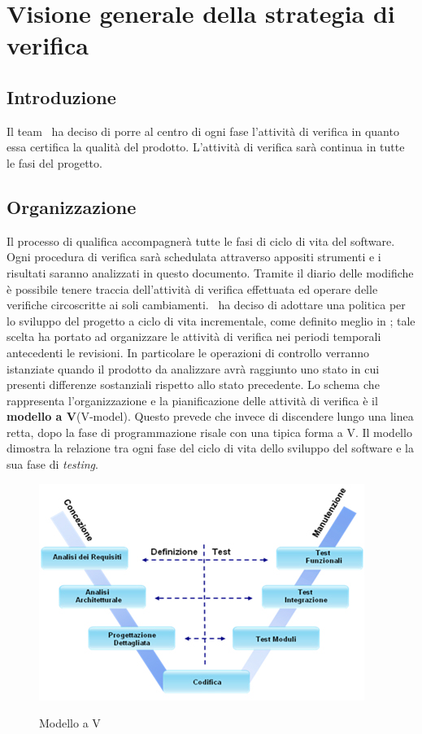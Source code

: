 \section{Visione generale della strategia di verifica}
\subsection{Introduzione}
Il team \gruppo ~ha deciso di porre al centro di ogni fase l'attività di verifica in quanto essa certifica la qualità del prodotto. L'attività di verifica sarà continua in tutte le fasi del progetto.\\
\subsection{Organizzazione}
Il processo di qualifica accompagnerà tutte le fasi di ciclo di vita del software. Ogni procedura di verifica sarà schedulata attraverso appositi strumenti e i risultati saranno analizzati in questo documento. Tramite il diario delle modifiche è possibile tenere traccia dell'attività di verifica effettuata ed operare delle verifiche circoscritte ai soli cambiamenti.
\gruppo ~ha deciso di adottare una politica per lo sviluppo del progetto a ciclo di vita incrementale, come definito meglio in \infoPDP; tale scelta ha portato ad organizzare le attività di verifica nei periodi temporali antecedenti le revisioni.
In particolare le operazioni di controllo verranno istanziate quando il prodotto da analizzare avrà raggiunto uno stato in cui presenti differenze sostanziali rispetto allo stato precedente.
Lo schema che rappresenta l'organizzazione e la pianificazione delle attività di verifica è il \textbf{modello a V}(V-model). Questo prevede che invece di discendere lungo una linea retta, dopo la fase di programmazione risale con una tipica forma a V. Il modello dimostra la relazione tra ogni fase del ciclo di vita dello sviluppo del software e la sua fase di \textit{testing}.
\begin{figure} [H]
\centering
     \includegraphics[scale=0.8]{../modello/img/V}\\
     \caption{Modello a V}\label{fig:1}
\end{figure}
